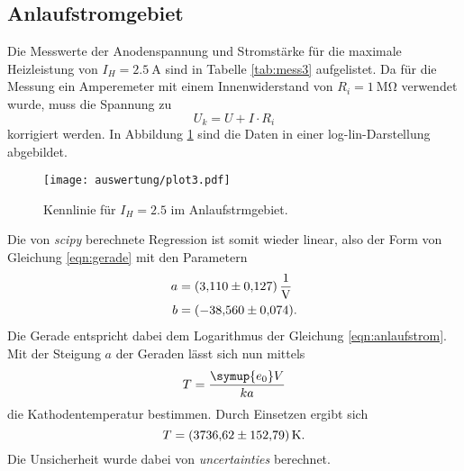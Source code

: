 \subsection{Anlaufstromgebiet}
\label{sec:anlauf}
Die Messwerte der Anodenspannung und Stromstärke für die maximale Heizleistung von $I_H=\SI{2.5}{\ampere}$ sind in Tabelle \ref{tab:mess3}
aufgelistet. Da für die Messung ein Amperemeter mit einem Innenwiderstand von $R_i=\SI{1}{\mega\ohm}$ verwendet wurde, muss die Spannung
zu 
\begin{equation*}
    U_k=U+I\cdot R_i
\end{equation*}
korrigiert werden. In Abbildung \ref{fig:plot3} sind die Daten in einer log-lin-Darstellung abgebildet. 
\begin{figure}[H]
    \centering
    \texttt{[image: auswertung/plot3.pdf]}
    \caption{Kennlinie für $I_H=2.5$ im Anlaufstrmgebiet.}
    \label{fig:plot3}
\end{figure}
\noindent
Die von \textit{scipy} \cite{scipy} berechnete Regression ist somit wieder linear, also der Form von Gleichung \eqref{eqn:gerade} mit den Parametern
\begin{align*}
    a &= \SI{  3.11 \pm 0.127}{\per\volt}\\
    b &= \SI{-38.56 \pm 0.074}{}    .
\end{align*}
Die Gerade entspricht dabei dem Logarithmus der Gleichung \eqref{eqn:anlaufstrom}.
Mit der Steigung $a$ der Geraden lässt sich nun mittels
\begin{equation*}
    T=\frac{\symup{e_0}V}{ka}
\end{equation*}
die Kathodentemperatur bestimmen. Durch Einsetzen ergibt sich
\begin{equation*}
    T=\SI{3736.62 \pm 152.79}{\kelvin}  .
\end{equation*}
Die Unsicherheit wurde dabei von \textit{uncertainties} \cite{uncertainties} berechnet.

